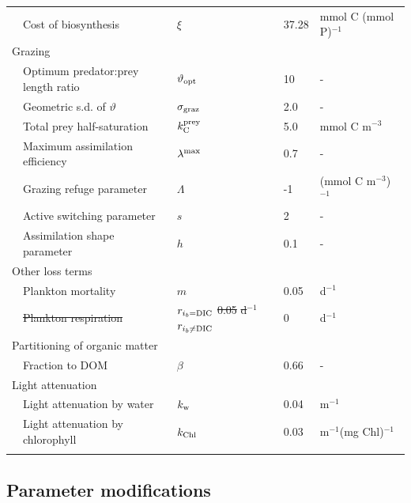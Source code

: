 \documentclass[gmd, manuscript]{copernicus}
\providecommand{\DIFdel}[1]{{\protect\color{red}\sout{#1}}}                      %
\providecommand{\DIFdelFL}[1]{\DIFdel{#1}} %
\providecommand{\DIFdelbeginFL}{} %
\providecommand{\DIFdelendFL}{} %
\begin{document}
\begin{table}[htp!]
\begin{tabular*}{1.0\textwidth}{@{\extracolsep{\fill}}lllll}
& Cost of biosynthesis & $\xi$ & 37.28 & mmol C (mmol P)$^{-1}$ \\ 
\multicolumn{5}{l}{{Grazing}}\\ 
& Optimum predator:prey length ratio & $\vartheta_{\rm opt}$ & 10 & - \\ 
& Geometric s.d. of $\vartheta$ & $\sigma_{\rm graz}$ & 2.0 & - \\ 
& Total prey half-saturation & $k^{\rm prey}_{\rm C}$ & 5.0 & mmol C m$^{-3}$ \\ 
& Maximum assimilation efficiency & $\lambda^{\rm max}$ & 0.7 & - \\ 
& Grazing refuge parameter & $\Lambda$ & -1 & (mmol C m$^{-3}$)$^{-1}$ \\ 
& Active switching parameter & $s$ & 2 & - \\ 
& Assimilation shape parameter & $h$ & 0.1 & - \\ 
\multicolumn{5}{l}{{Other loss terms}}\\ 
& Plankton mortality & $m$ & 0.05 & d$^{-1}$ \\ 
& 					\DIFdelbeginFL \DIFdelFL{Plankton respiration 	}\DIFdelendFL & \DIFdelbeginFL \DIFdelFL{$r_{i_b={\rm DIC}}$ }%
\DIFdelFL{0.05 }%
\DIFdelFL{d$^{-1}$ }%
\DIFdelendFL $r_{i_b\neq{\rm DIC}}$ & 0 & d$^{-1}$ \\ 
\multicolumn{5}{l}{{Partitioning of organic matter}}\\ 
& Fraction to DOM & $\beta$ & 0.66 & - \\ 
\multicolumn{4}{l}{{Light attenuation}} \\ 
&Light attenuation by water & $k_{\rm w}$ & 0.04 & m$^{-1}$ \\ 
&Light attenuation by chlorophyll & $k_{\rm Chl}$ & 0.03 & m$^{-1}$(mg Chl)$^{-1}$ \\ [+1ex]
\hline\\ [-1ex]
\end{tabular*}
\label{Size_independent}
\end{table}


\subsection{Parameter modifications}
\end{document}
